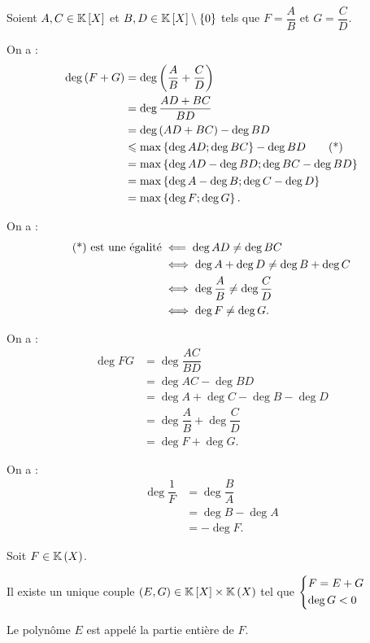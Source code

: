 \begin{dem}[Globale]
Soient \(A,C\in\poly\) et \(B,D\in\poly\excluant\accol{0}\) tels que \(F=\dfrac{A}{B}\) et \(G=\dfrac{C}{D}\).
\end{dem}

\begin{dem}[1]
On a : \[\begin{aligned}
\deg\left(F+G\right)&=\deg\left(\dfrac{A}{B}+\dfrac{C}{D}\right) \\
&=\deg\dfrac{AD+BC}{BD} \\
&=\deg\left(AD+BC\right)-\deg BD \\
&\leqslant\max\left\lbrace\deg AD;\deg BC\right\rbrace-\deg BD\qquad\text{(*)} \\
&=\max\left\lbrace\deg AD-\deg BD;\deg BC-\deg BD\right\rbrace \\
&=\max\left\lbrace\deg A-\deg B;\deg C-\deg D\right\rbrace \\
&=\max\left\lbrace\deg F;\deg G\right\rbrace.
\end{aligned}\]

On a : \[\begin{aligned}
\text{(*) est une égalité}&\impliedby\deg AD\not=\deg BC \\
&\iff\deg A+\deg D\not=\deg B+\deg C \\
&\iff\deg\dfrac{A}{B}\not=\deg\dfrac{C}{D} \\
&\iff\deg F\not=\deg G.
\end{aligned}\]
\end{dem}

\begin{dem}[2]
On a : \[\begin{aligned}
\deg FG&=\deg\dfrac{AC}{BD} \\
&=\deg AC-\deg BD \\
&=\deg A+\deg C-\deg B-\deg D \\
&=\deg\dfrac{A}{B}+\deg\dfrac{C}{D} \\
&=\deg F+\deg G.
\end{aligned}\]
\end{dem}

\begin{dem}[3]
On a : \[\begin{aligned}
\deg\dfrac{1}{F}&=\deg\dfrac{B}{A} \\
&=\deg B-\deg A \\
&=-\deg F.
\end{aligned}\]
\end{dem}

\begin{defprop}
Soit \(F\in\fracrat\).

Il existe un unique couple \(\paren{E,G}\in\poly\times\fracrat\) tel que \(\begin{dcases}F=E+G \\ \deg G<0\end{dcases}\)

Le polynôme \(E\) est appelé la partie entière de \(F\).
\end{defprop}

